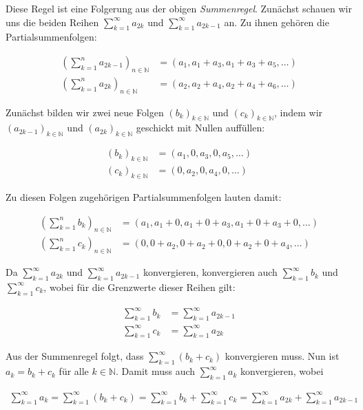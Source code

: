 \documentclass[fontsize=9pt,
               parskip=half-,
               DIV=14,
               listof=chapterentry,
               tocflat]{scrbook}
\begin{document}
\begin{proof*}
Diese Regel ist eine Folgerung aus der obigen \emph{Summenregel}. Zunächst schauen wir uns die beiden Reihen $\sum _{k=1}^{\infty }a_{2k}$ und $\sum _{k=1}^{\infty }a_{2k-1}$ an. Zu ihnen gehören die Partialsummenfolgen:

\begin{align*}
\left(\sum _{k=1}^{n}a_{2k-1}\right)_{n\in \mathbb {N} }&=(a_{1},a_{1}+a_{3},a_{1}+a_{3}+a_{5},\ldots )\\[0.5em]\left(\sum _{k=1}^{n}a_{2k}\right)_{n\in \mathbb {N} }&=(a_{2},a_{2}+a_{4},a_{2}+a_{4}+a_{6},\ldots )
\end{align*}

Zunächst bilden wir zwei neue Folgen $(b_{k})_{k\in \mathbb {N} }$ und $(c_{k})_{k\in \mathbb {N} }$, indem wir $(a_{2k-1})_{k\in \mathbb {N} }$ und $(a_{2k})_{k\in \mathbb {N} }$ geschickt mit Nullen auffüllen:

\begin{align*}
(b_{k})_{k\in \mathbb {N} }&=(a_{1},0,a_{3},0,a_{5},\ldots )\\[0.5em](c_{k})_{k\in \mathbb {N} }&=(0,a_{2},0,a_{4},0,\ldots )
\end{align*}

Zu diesen Folgen zugehörigen Partialsummenfolgen lauten damit:

\begin{align*}
\left(\sum _{k=1}^{n}b_{k}\right)_{n\in \mathbb {N} }&=(a_{1},a_{1}+0,a_{1}+0+a_{3},a_{1}+0+a_{3}+0,\ldots )\\[0.5em]\left(\sum _{k=1}^{n}c_{k}\right)_{n\in \mathbb {N} }&=(0,0+a_{2},0+a_{2}+0,0+a_{2}+0+a_{4},\ldots )
\end{align*}

Da $\sum _{k=1}^{\infty }a_{2k}$ und $\sum _{k=1}^{\infty }a_{2k-1}$ konvergieren, konvergieren auch $\sum _{k=1}^{\infty }b_{k}$ und $\sum _{k=1}^{\infty }c_{k}$, wobei für die Grenzwerte dieser Reihen gilt:

\begin{align*}
\sum _{k=1}^{\infty }b_{k}&=\sum _{k=1}^{\infty }a_{2k-1}\\[0.5em]\sum _{k=1}^{\infty }c_{k}&=\sum _{k=1}^{\infty }a_{2k}
\end{align*}

Aus der Summenregel folgt, dass $\sum _{k=1}^{\infty }(b_{k}+c_{k})$ konvergieren muss. Nun ist $a_{k}=b_{k}+c_{k}$ für alle $k\in \mathbb {N} $. Damit muss auch $\sum _{k=1}^{\infty }a_{k}$ konvergieren, wobei

\begin{align*}
\sum _{k=1}^{\infty }a_{k}=\sum _{k=1}^{\infty }(b_{k}+c_{k})=\sum _{k=1}^{\infty }b_{k}+\sum _{k=1}^{\infty }c_{k}=\sum _{k=1}^{\infty }a_{2k}+\sum _{k=1}^{\infty }a_{2k-1}
\end{align*}

\end{proof*}
\end{document}
